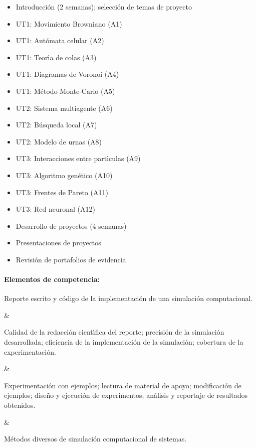 \begin{itemize}[itemsep=-3pt]
\item{Introducci\'{o}n (2 semanas); selecci\'{o}n de temas de
  proyecto}
\item{UT1: Movimiento Browniano (A1)}
\item{UT1: Aut\'{o}mata celular (A2)}
\item{UT1: Teor\'{\i}a de colas (A3)}
\item{UT1: Diagramas de Voronoi (A4)}
\item{UT1: M\'{e}todo Monte-Carlo (A5)}
\item{UT2: Sistema multiagente (A6)}
\item{UT2: B\'{u}squeda local (A7)}
\item{UT2: Modelo de urnas (A8)}
\item{UT3: Interacciones entre part\'{\i}culas (A9)}
\item{UT3: Algoritmo gen\'{e}tico (A10)}
\item{UT3: Frentes de Pareto (A11)}
\item{UT3: Red neuronal (A12)}
\item{Desarrollo de proyectos (4 semanas)}  
\item{Presentaciones de proyectos}
\item{Revisi\'{o}n de portafolios de evidencia}
\end{itemize}

\paragraph{Elementos de competencia:}

\quad



Reporte escrito y c\'{o}digo de la implementaci\'{o}n de una
simulaci\'{o}n computacional.

&

Calidad de la redacci\'{o}n cient\'{\i}fica del reporte; 
precisi\'{o}n de la simulaci\'{o}n desarrollada;
eficiencia de la implementaci\'{o}n de la simulaci\'{o}n;
cobertura de la experimentaci\'{o}n.

&

Experimentaci\'{o}n con ejemplos; lectura de material de apoyo;
modificaci\'{o}n de ejemplos; dise\~{n}o y ejecuci\'{o}n de experimentos;
an\'{a}lisis y reportaje de resultados obtenidos.

&

M\'{e}todos diversos de simulaci\'{o}n computacional de sistemas.

